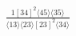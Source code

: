 \documentclass[varwidth, border=5pt]{standalone}
\begin{document}
\begin{my}
$\begin{gathered}
\scriptscriptstyle\frac{1[34]^2⟨45⟩⟨35⟩}{⟨13⟩⟨23⟩[23]^2⟨34⟩}
\end{gathered}$
\end{my}
\end{document}
